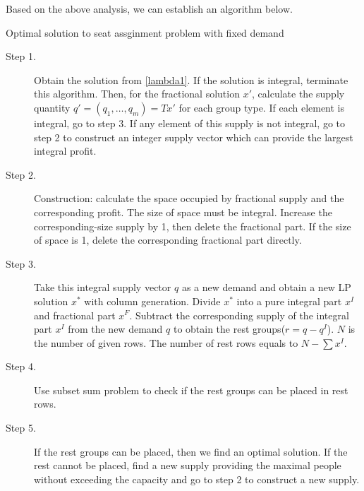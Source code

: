 %

Based on the above analysis, we can establish an algorithm below.

\begin{algorithm}[H]\label{algoDI}
\caption{Optimal solution to seat assginment problem with fixed demand}
\begin{description}
  \item[Step 1.] Obtain the solution from \eqref{lambda1}. If the solution is integral, terminate this algorithm. Then, for the fractional solution $x{'}$, calculate the supply quantity $q{'}=(q_1,\ldots,q_m) = Tx{'}$ for each group type. If each element is integral, go to step 3. If any element of this supply is not integral, go to step 2 to construct an integer supply vector which can provide the largest integral profit.
  \vspace{5pt}
  \item[Step 2.] Construction: calculate the space occupied by fractional supply and the corresponding profit. The size of space must be integral. Increase the corresponding-size supply by 1, then delete the fractional part. If the size of space is 1, delete the corresponding fractional part directly. 

  \item[Step 3.] Take this integral supply vector $q$ as a new demand and obtain a new LP solution $x^{*}$ with column generation. Divide $x^{*}$ into a pure integral part $x^I$ and fractional part $x^F$. Subtract the corresponding supply of the integral part $x^I$ from the new demand $q$ to obtain the rest groups($r = q - q^I$). $N$ is the number of given rows. The number of rest rows equals to $N - \sum x^I$.
  \item[Step 4.] Use subset sum problem to check if the rest groups can be placed in rest rows.
  \item[Step 5.] If the rest groups can be placed, then we find an optimal solution. If the rest cannot be placed, find a new supply providing the maximal people without exceeding the capacity and go to step 2 to construct a new supply.
\end{description}
\end{algorithm}

